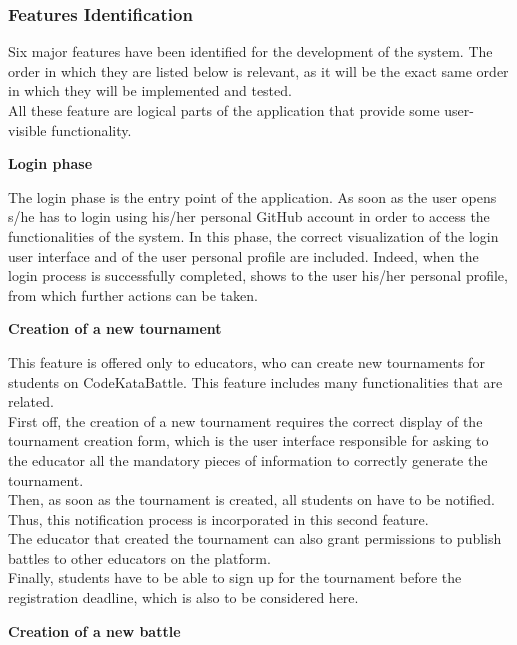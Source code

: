 \subsubsection{Features Identification}
Six major features have been identified for the development of the \app system. The order in which they are listed below is relevant, as it will be the exact same order in which they will be implemented and tested.\\
All these feature are logical parts of the application that provide some user-visible functionality.

\vspace{0.5cm}

\textbf{Login phase}

The login phase is the entry point of the application. As soon as the user opens \app s/he has to login using his/her personal GitHub account in order to access the functionalities of the system.
In this phase, the correct visualization of the login user interface and of the user personal profile are included. Indeed, when the login process is successfully completed, \app shows to the user his/her personal profile, from which further actions can be taken.

\vspace{0.5cm}

\textbf{Creation of a new tournament}

This feature is offered only to educators, who can create new tournaments for students on CodeKataBattle. This feature includes many functionalities that are related.\\
First off, the creation of a new tournament requires the correct display of the tournament creation form, which is the user interface responsible for asking to the educator all the mandatory pieces of information to correctly generate the tournament. \\
Then, as soon as the tournament is created, all students on \app have to be notified. Thus, this notification process is incorporated in this second feature.\\
The educator that created the tournament can also grant permissions to publish battles to other educators on the platform.\\
Finally, students have to be able to sign up for the tournament before the registration deadline, which is also to be considered here.

\vspace{0.5cm}

\textbf{Creation of a new battle}

